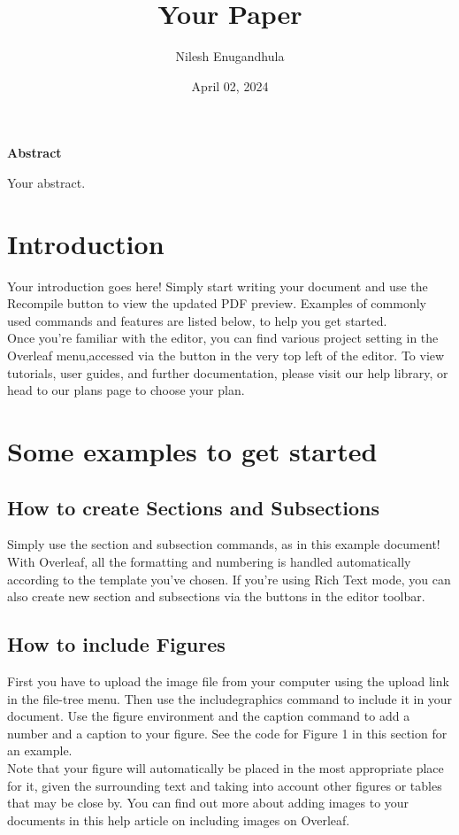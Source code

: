 \documentclass{article}
\title{Your Paper}
\author{Nilesh Enugandhula}
\date{April 02, 2024}
\begin{document}
	
	\maketitle
	\begin{center}
		\textbf{Abstract}
	\end{center}
	Your abstract.
	
	\section{Introduction}
	Your introduction goes here! Simply start writing your document and use the Recompile button to
	view the updated PDF preview. Examples of commonly used commands and features are listed below,
	to help you get started.\\
    \indent Once you’re familiar with the editor, you can find various project setting in the Overleaf menu,accessed via the button in the very top left of the editor. To view tutorials, user guides, and further documentation, please visit our help library, or head to our plans page to choose your plan.
    
    \section{Some examples to get started}
    \subsection{How to create Sections and Subsections}
    Simply use the section and subsection commands, as in this example document! With Overleaf, all
    the formatting and numbering is handled automatically according to the template you’ve chosen. If you’re using Rich Text mode, you can also create new section and subsections via the buttons in the editor toolbar.
    \subsection{How to include Figures}
    First you have to upload the image file from your computer using the upload link in the file-tree menu. Then use the includegraphics command to include it in your document. Use the figure environment and the caption command to add a number and a caption to your figure. See the code for Figure 1 in this section for an example.\\ 
    \indent Note that your figure will automatically be placed in the most appropriate place for it, given the
    surrounding text and taking into account other figures or tables that may be close by. You can find out more about adding images to your documents in this help article on including images on Overleaf.
    
\end{document}
